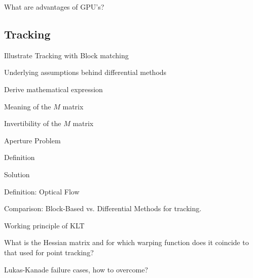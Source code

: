 \documentclass[10pt,a4paper]{scrartcl}
\begin{document}
\begin{multicols*}{2}
\begin{QandA}
{What are advantages of GPU's?}
\item
\end{QandA}

\subsection*{Tracking}

\begin{QandA}
{Illustrate Tracking with Block matching}
\item
\end{QandA}

\begin{QandA}
{Underlying assumptions behind differential methods}
\item Derive mathematical expression
\item Meaning of the $M$ matrix
\end{QandA}

\begin{QandA}
{Invertibility of the $M$ matrix}
\item
\end{QandA}

\begin{QandA}
{Aperture Problem}
\item Definition
\item Solution
\end{QandA}

\begin{QandA}
{Definition: Optical Flow}
\item
\end{QandA}

\begin{QandA}
{Comparison: Block-Based vs. Differential Methods for tracking.}
\item
\end{QandA}

\begin{QandA}
{Working principle of KLT}
\item
\end{QandA}

\begin{QandA}
{What is the Hessian matrix and for which warping function does it coincide to that used for point tracking?}
\item
\end{QandA}

\begin{QandA}
{Lukas-Kanade failure cases, how to overcome?}
\item
\end{QandA}


\end{multicols*}
\end{document}
